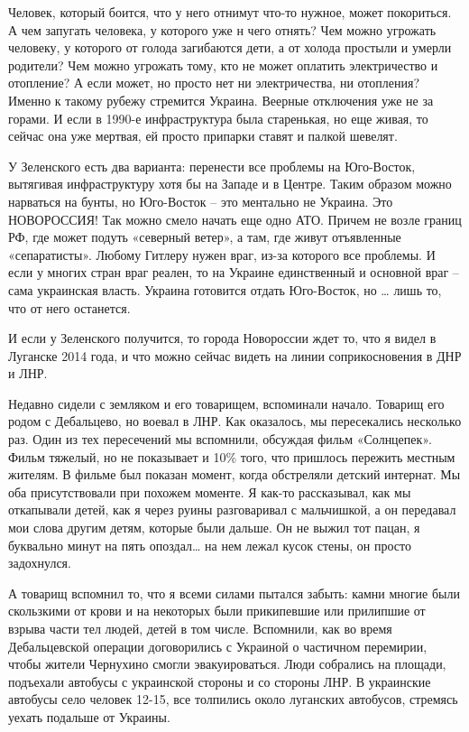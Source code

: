 Человек, который боится, что у него отнимут что-то нужное, может покориться. А
чем запугать человека, у которого уже н чего отнять? Чем можно угрожать
человеку, у которого от голода загибаются дети, а от холода простыли и умерли
родители? Чем можно угрожать тому, кто не может оплатить электричество и
отопление? А если может, но просто нет ни электричества, ни отопления? Именно к
такому рубежу стремится Украина. Веерные отключения уже не за горами. И если в
1990-е инфраструктура была старенькая, но еще живая, то сейчас она уже мертвая,
ей просто припарки ставят и палкой шевелят.

У Зеленского есть два варианта: перенести все проблемы на Юго-Восток, вытягивая
инфраструктуру хотя бы на Западе и в Центре. Таким образом можно нарваться на
бунты, но Юго-Восток – это ментально не Украина. Это НОВОРОССИЯ! Так можно
смело начать еще одно АТО. Причем не возле границ РФ, где может подуть
«северный ветер», а там, где живут отъявленные «сепаратисты». Любому Гитлеру
нужен враг, из-за которого все проблемы. И если у многих стран враг реален, то
на Украине единственный и основной враг – сама украинская власть. Украина
готовится отдать Юго-Восток, но … лишь то, что от него останется.

И если у Зеленского получится, то города Новороссии ждет то, что я видел в
Луганске 2014 года, и что можно сейчас видеть на линии соприкосновения в ДНР и
ЛНР.

Недавно сидели с земляком и его товарищем, вспоминали начало. Товарищ его родом
с Дебальцево, но воевал в ЛНР. Как оказалось, мы пересекались несколько раз.
Один из тех пересечений мы вспомнили, обсуждая фильм «Солнцепек». Фильм
тяжелый, но не показывает и 10\% того, что пришлось пережить местным жителям. В
фильме был показан момент, когда обстреляли детский интернат. Мы оба
присутствовали при похожем моменте. Я как-то рассказывал, как мы откапывали
детей, как я через руины разговаривал с мальчишкой, а он передавал мои слова
другим детям, которые были дальше. Он не выжил тот пацан, я буквально минут на
пять опоздал… на нем лежал кусок стены, он просто задохнулся.

А товарищ вспомнил то, что я всеми силами пытался забыть: камни многие были
скользкими от крови и на некоторых были прикипевшие или прилипшие от взрыва
части тел людей, детей в том числе. Вспомнили, как во время Дебальцевской
операции договорились с Украиной о частичном перемирии, чтобы жители Чернухино
смогли эвакуироваться. Люди собрались на площади, подъехали автобусы с
украинской стороны и со стороны ЛНР. В украинские автобусы село человек 12-15,
все толпились около луганских автобусов, стремясь уехать подальше от Украины.


